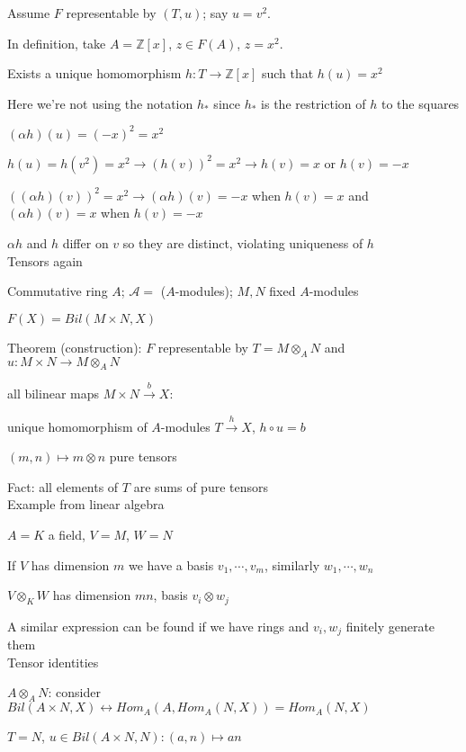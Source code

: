 \documentclass[12pt]{article}
\begin{document}
Assume $F$ representable by $(T, u)$; say $u = v^2$.

In definition, take $A = \mathds{Z}[x]$, $z \in F(A)$, $z = x^2$.

Exists a unique homomorphism $h: T \to \mathds{Z}[x]$ such that $h(u) = x^2$

Here we're not using the notation $h_*$ since $h_*$ is the restriction of $h$ to the squares

$(\alpha h)(u) = (-x)^2 = x^2$

$h(u) = h(v^2) = x^2 \to (h(v))^2 = x^2 \to h(v) = x$ or $h(v) = -x$

$((\alpha h)(v))^2 = x^2 \to (\alpha h)(v) = -x$ when $h(v) = x$ and $(\alpha h)(v) = x$ when $h(v) = -x$

$\alpha h$ and $h$ differ on $v$ so they are distinct, violating uniqueness of $h$\\

\noindent
Tensors again

Commutative ring $A$; $\mathcal{A} =$ ($A$-modules); $M, N$ fixed $A$-modules

$F(X) = Bil(M \times N, X)$

Theorem (construction): $F$ representable by $T = M \otimes_A N$ and $u: M \times N \to M \otimes_A N$

all bilinear maps $M \times N \xrightarrow{b} X$:

unique homomorphism of $A$-modules $T \xrightarrow{h} X$, $h \circ u = b$

$(m, n) \mapsto m \otimes n$ pure tensors

Fact: all elements of $T$ are sums of pure tensors\\

\noindent
Example from linear algebra

$A = K$ a field, $V = M$, $W = N$

If $V$ has dimension $m$ we have a basis $v_1, \cdots, v_m$, similarly $w_1, \cdots, w_n$

$V \otimes_K W$ has dimension $mn$, basis $v_i \otimes w_j$

A similar expression can be found if we have rings and $v_i, w_j$ finitely generate them\\

\noindent
Tensor identities

\noindent
$A \otimes _A N$: consider $Bil(A \times N, X) \leftrightarrow Hom_A(A, Hom_A(N, X)) = Hom_A(N, X)$

$T = N$, $u \in Bil(A \times N, N): (a, n) \mapsto an$
\end{document}
